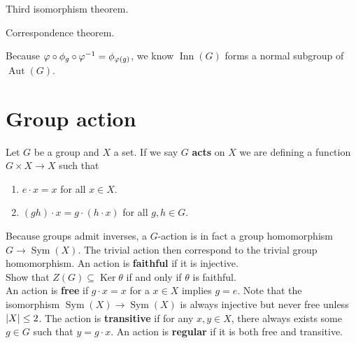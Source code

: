 \documentclass{report}
\begin{document}
Third isomorphism theorem. 

Correspondence theorem.


Because $ \phi\circ \pfi _g \circ \phi^{-1} = \pfi _{\phi(g)}$, we know $\operatorname{Inn}(G)$ forms a normal subgroup of $\operatorname{Aut}(G)$. \\
\section{Group action}
Let $G$ be a group and $X$ a set. If we say  $G$ \textbf{acts} on $X$ we are defining a function $G \times X\rightarrow X$ such that 
\begin{enumerate}[label=(\roman*)]
  \item $e\cdot x=x$ for all $x\in X$. 
  \item $(gh)\cdot x= g \cdot (h \cdot x)$ for all $g,h \in G$. 
\end{enumerate}
Because groups admit inverses, a $G$-action is in fact a group homomorphism $G \rightarrow \operatorname{Sym}(X)$. The trivial action then correspond to the trivial group homomorphism.  An action is \textbf{faithful} if it is injective. \\


Show that $Z(G)\subseteq \operatorname{Ker} \theta$ if and only if $\theta$ is faithful.  \\


An action is \textbf{free} if $g\cdot x=x$ for a $x\in X$ implies $g=e$. Note that the isomorphism $\operatorname{Sym}(X)\rightarrow \operatorname{Sym}(X)$ is always injective but never free unless $\left|X\right|\leq 2$. The action is \textbf{transitive} if for any $x,y \in X$, there always exists some $g \in G$ such that $y= g \cdot x$. An action is \textbf{regular} if it is both free and transitive.    \\
\end{document}
